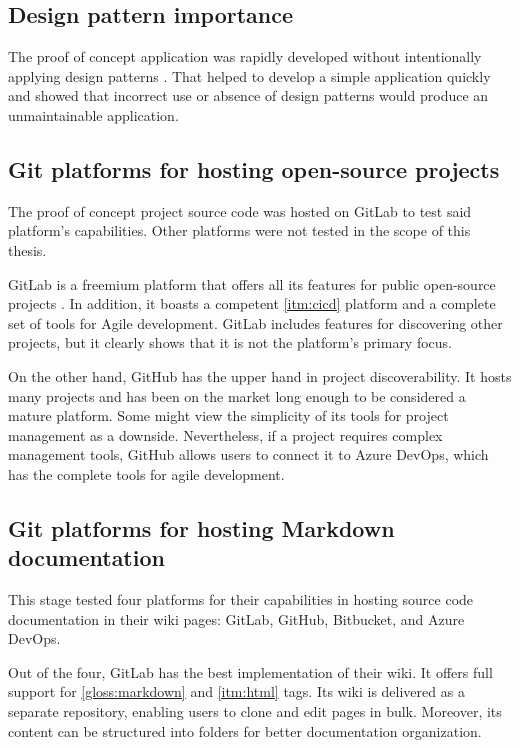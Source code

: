 \subsection{Design pattern importance}

The proof of concept application was rapidly developed without intentionally applying design patterns \cite{humblot_design_2021}. That helped to develop a simple application quickly and showed that incorrect use or absence of design patterns would produce an unmaintainable application.

\subsection{Git platforms for hosting open-source projects}

The proof of concept project source code was hosted on GitLab to test said platform's capabilities. Other platforms were not tested in the scope of this thesis.

GitLab is a freemium platform that offers all its features for public open-source projects \cite{gumster_6_2018}. In addition, it boasts a competent \ref{itm:cicd} platform and a complete set of tools for Agile development. GitLab includes features for discovering other projects, but it clearly shows that it is not the platform's primary focus.

On the other hand, GitHub has the upper hand in project discoverability. It hosts many projects and has been on the market long enough to be considered a mature platform. Some might view the simplicity of its tools for project management as a downside. Nevertheless, if a project requires complex management tools, GitHub allows users to connect it to Azure DevOps, which has the complete tools for agile development.

\subsection{Git platforms for hosting Markdown documentation}

This stage tested four platforms for their capabilities in hosting source code documentation in their wiki pages: GitLab, GitHub, Bitbucket, and Azure DevOps.

Out of the four, GitLab has the best implementation of their wiki. It offers full support for \ref{gloss:markdown} and \ref{itm:html} tags.
Its wiki is delivered as a separate repository, enabling users to clone and edit pages in bulk. Moreover, its content can be structured into folders for better documentation organization.

